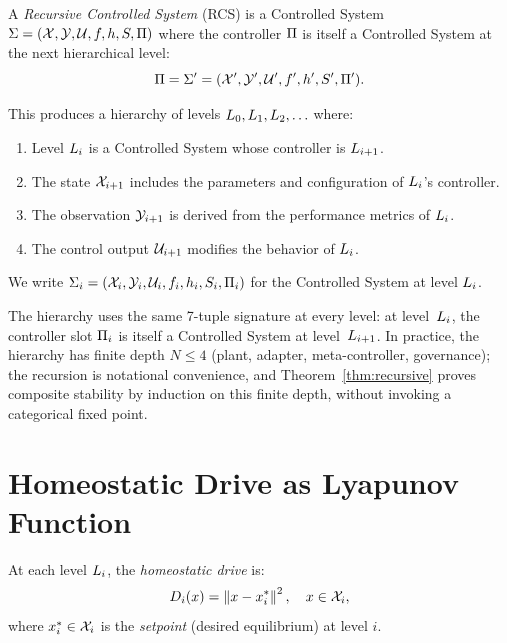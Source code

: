 \documentclass[11pt,a4paper]{article}
\begin{document}
\begin{definition}
\label{def:rcs}
A \emph{Recursive Controlled System} (RCS) is a Controlled System
$\Sigma = (\mathcal{X}, \mathcal{Y}, \mathcal{U}, f, h, S, \Pi)$ where the controller
$\Pi$ is itself a Controlled System at the next hierarchical level:
\begin{equation}
  \Pi = \Sigma' = (\mathcal{X}', \mathcal{Y}', \mathcal{U}', f', h', S', \Pi').
\end{equation}

This produces a hierarchy of levels $L_{0}, L_{1}, L_{2}, \ldots$ where:
\begin{enumerate}
  \item Level $L_{i}$ is a Controlled System whose controller is $L_{i+1}$.
  \item The state $\mathcal{X}_{i+1}$ includes the parameters and configuration of
        $L_{i}$'s controller.
  \item The observation $\mathcal{Y}_{i+1}$ is derived from the performance metrics of
        $L_{i}$.
  \item The control output $\mathcal{U}_{i+1}$ modifies the behavior of $L_{i}$.
\end{enumerate}

We write $\Sigma_i = (\mathcal{X}_i, \mathcal{Y}_i, \mathcal{U}_i, f_i, h_i, S_i, \Pi_i)$
for the Controlled System at level $L_{i}$.
\end{definition}

\begin{remark}
\label{rem:structural-self-similarity}
The hierarchy uses the same 7-tuple signature at every level: at
level~$L_{i}$, the controller slot $\Pi_i$ is itself a Controlled
System at level~$L_{i+1}$.  In practice, the hierarchy has finite
depth $N \leq 4$ (plant, adapter, meta-controller, governance); the
recursion is notational convenience, and
Theorem~\ref{thm:recursive} proves composite stability by induction on
this finite depth, without invoking a categorical fixed point.
\end{remark}


\section{Homeostatic Drive as Lyapunov Function}
\label{sec:drive}

\begin{definition}
\label{def:drive}
At each level $L_{i}$, the \emph{homeostatic drive} is:
\begin{equation}
  D_{i}(x) = \left\| x - x^*_{i} \right\|^2, \quad x \in \mathcal{X}_i,
\end{equation}
where $x^*_{i} \in \mathcal{X}_i$ is the \emph{setpoint} (desired equilibrium) at
level $i$.
\end{definition}
\end{document}
